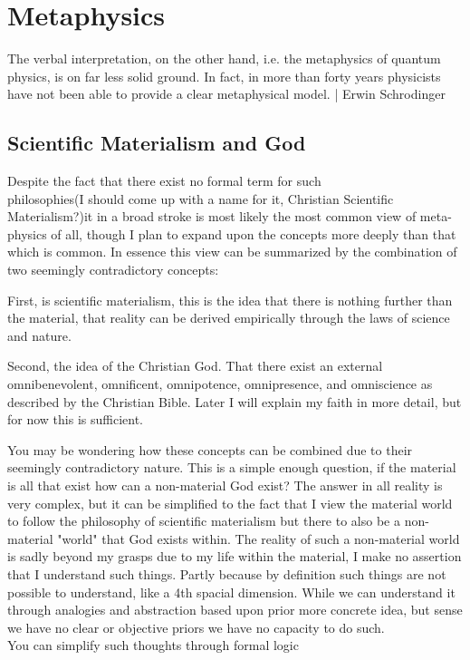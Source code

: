 \chapter{Metaphysics}
The verbal interpretation, on the other hand, i.e. the metaphysics of quantum physics, is on far less solid ground. In fact, in more than forty years physicists have not been able to provide a clear metaphysical model. | Erwin Schrodinger
\section{Scientific Materialism and God}

\par Despite the fact that there exist no
formal term for such \\
philosophies(I should come up with a name for it, Christian Scientific Materialism?)it in a broad stroke is most likely the most common view of meta-physics of all, though I plan to expand upon the concepts more deeply than that which is common. In essence this view can be summarized by the combination of two seemingly contradictory concepts:

\par    First, is scientific materialism, this is the idea that there is nothing further than the material, that reality can be derived empirically through the laws of science and nature.

\par    Second, the idea of the Christian God. That there exist an external omnibenevolent, omnificent, omnipotence, omnipresence, and omniscience as described by the Christian Bible. Later I will explain my faith in more detail, but for now this is sufficient.

\par You may be wondering how these concepts can be combined due to their seemingly contradictory nature. This is a simple enough question, if the material is all that exist how can a non-material God exist? The answer in all reality is very complex, but it can be simplified to the fact that I view the material world to follow the philosophy of scientific materialism but there to also be a non-material "world" that God exists within. The reality of such a non-material world is sadly beyond my grasps due to my life within the material, I make no assertion that I understand such things. Partly because by definition such things are not possible to understand, like a 4th spacial dimension. While we can understand it through analogies and abstraction based upon prior more concrete idea, but sense we have no clear or objective priors we have no capacity to do such. \\
You can simplify such thoughts through formal logic \\

